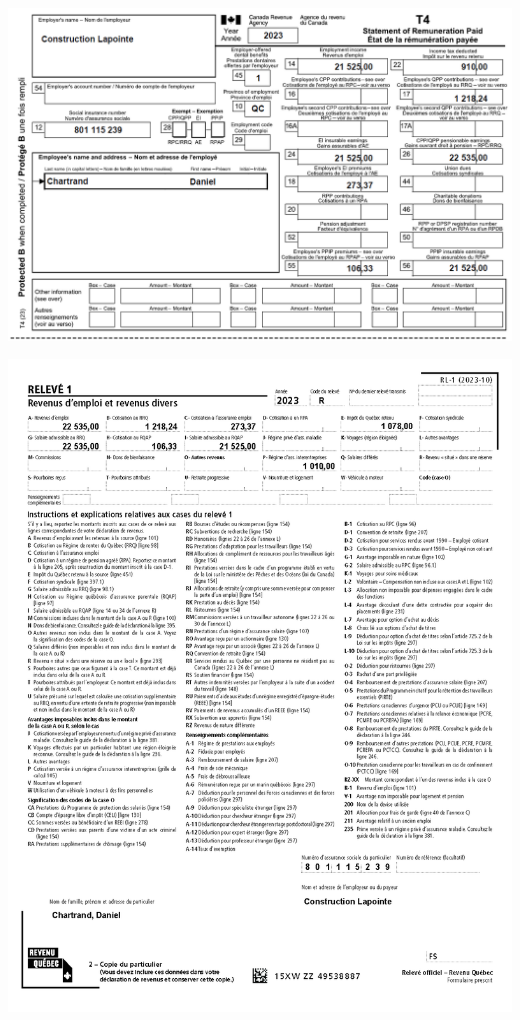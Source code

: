 \noindent
\includegraphics[width=\textwidth]{probleme/chapitre-2/T4-ConstructionLapointe.png}

\noindent
\includegraphics[width=\textwidth]{probleme/chapitre-2/RL1-ConstructionLapointe.png}

